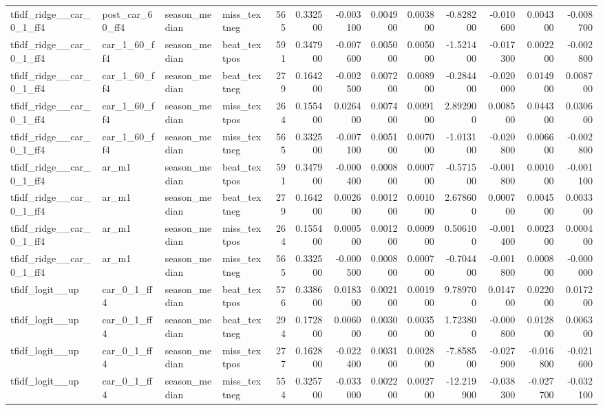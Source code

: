 \begin{table}
\begin{tabular}{llllrrrrrrrrr}
tfidf\_ridge\_\_car\_0\_1\_ff4 & post\_car\_60\_ff4 & season\_median & miss\_textneg & 565 & 0.332500 & -0.003100 & 0.004900 & 0.003800 & -0.828200 & -0.010600 & 0.004300 & -0.008700 \\
tfidf\_ridge\_\_car\_0\_1\_ff4 & car\_1\_60\_ff4 & season\_median & beat\_textpos & 591 & 0.347900 & -0.007600 & 0.005000 & 0.005000 & -1.521400 & -0.017300 & 0.002200 & -0.002800 \\
tfidf\_ridge\_\_car\_0\_1\_ff4 & car\_1\_60\_ff4 & season\_median & beat\_textneg & 279 & 0.164200 & -0.002500 & 0.007200 & 0.008900 & -0.284400 & -0.020000 & 0.014900 & 0.008700 \\
tfidf\_ridge\_\_car\_0\_1\_ff4 & car\_1\_60\_ff4 & season\_median & miss\_textpos & 264 & 0.155400 & 0.026400 & 0.007400 & 0.009100 & 2.892900 & 0.008500 & 0.044300 & 0.030600 \\
tfidf\_ridge\_\_car\_0\_1\_ff4 & car\_1\_60\_ff4 & season\_median & miss\_textneg & 565 & 0.332500 & -0.007100 & 0.005100 & 0.007000 & -1.013100 & -0.020800 & 0.006600 & -0.002800 \\
tfidf\_ridge\_\_car\_0\_1\_ff4 & ar\_m1 & season\_median & beat\_textpos & 591 & 0.347900 & -0.000400 & 0.000800 & 0.000700 & -0.571500 & -0.001800 & 0.001000 & -0.001100 \\
tfidf\_ridge\_\_car\_0\_1\_ff4 & ar\_m1 & season\_median & beat\_textneg & 279 & 0.164200 & 0.002600 & 0.001200 & 0.001000 & 2.678600 & 0.000700 & 0.004500 & 0.003300 \\
tfidf\_ridge\_\_car\_0\_1\_ff4 & ar\_m1 & season\_median & miss\_textpos & 264 & 0.155400 & 0.000500 & 0.001200 & 0.000900 & 0.506100 & -0.001400 & 0.002300 & 0.000400 \\
tfidf\_ridge\_\_car\_0\_1\_ff4 & ar\_m1 & season\_median & miss\_textneg & 565 & 0.332500 & -0.000500 & 0.000800 & 0.000700 & -0.704400 & -0.001800 & 0.000800 & -0.000000 \\
tfidf\_logit\_\_up & car\_0\_1\_ff4 & season\_median & beat\_textpos & 576 & 0.338600 & 0.018300 & 0.002100 & 0.001900 & 9.789700 & 0.014700 & 0.022000 & 0.017200 \\
tfidf\_logit\_\_up & car\_0\_1\_ff4 & season\_median & beat\_textneg & 294 & 0.172800 & 0.006000 & 0.003000 & 0.003500 & 1.723800 & -0.000800 & 0.012800 & 0.006300 \\
tfidf\_logit\_\_up & car\_0\_1\_ff4 & season\_median & miss\_textpos & 277 & 0.162800 & -0.022400 & 0.003100 & 0.002800 & -7.858500 & -0.027900 & -0.016800 & -0.021600 \\
tfidf\_logit\_\_up & car\_0\_1\_ff4 & season\_median & miss\_textneg & 554 & 0.325700 & -0.033000 & 0.002200 & 0.002700 & -12.219900 & -0.038300 & -0.027700 & -0.032100 \\

\end{tabular}
\end{table}

